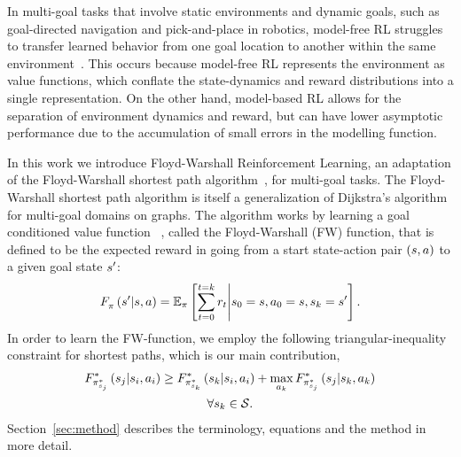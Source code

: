 In multi-goal tasks that involve static environments and dynamic goals,
such as goal-directed navigation and pick-and-place in robotics,
model-free RL struggles to transfer learned behavior from one goal
location to another within the same
environment~\citep{dhiman2018critical}. This occurs because model-free
RL represents the environment as value functions, which conflate the
state-dynamics and reward distributions into a single representation.
On the other hand, model-based RL allows for the separation of
environment dynamics and reward, but can have lower asymptotic
performance due to the accumulation of small errors in the modelling function.

In this work we introduce Floyd-Warshall Reinforcement Learning, an
adaptation of the Floyd-Warshall shortest path
algorithm~\citep{floydwarshall1962}, for multi-goal tasks.
The Floyd-Warshall shortest path algorithm is itself a generalization of
Dijkstra's algorithm for multi-goal domains on graphs. The algorithm works
by learning a goal conditioned value function
~\citep{schaul2015universal}, called the Floyd-Warshall (FW) function,
that is defined to be the expected reward in going from a start
state-action pair $(s, a)$ to a given goal state $s'$:
%
\begin{align}
F_{\pi}^{}\left({s'}\middle|{s}, {a}\right) =
\mathbb{E}_{\pi}\left[ \sum_{t=0}^{t=k} r_t \middle\vert s_0 = s, a_0 = s, s_k = s' \right] .
\end{align}%
%
In order to learn the FW-function, we employ the following
triangular-inequality constraint for shortest paths, which is our main
contribution,
%
\begin{multline}
\fwargs{\state_i}{\act_i}{\state_j}{\policy^*_{\state_j}}{*}
 \ge 
  \fwargs{\state_i}{\act_i}{\state_k}{\policy^*_{\state_k}}{*}
  + \max_{\act_k}\fwargs{\state_k}{\act_k}{\state_j}{\policy^*_{\state_j}}{*}
  \\
  \forall \state_k \in \State.
  \label{eq:fwconstraint}
\end{multline}%
%
Section~\ref{sec:method} describes the terminology, equations and the method in more detail.

